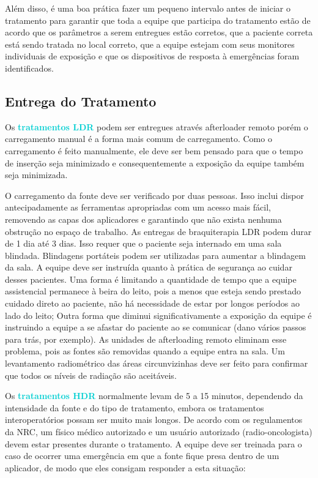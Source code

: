 \documentclass[11pt,a4paper]{article}
\newcounter{exemplo}
\begin{document}
	Além disso, é uma boa prática fazer um pequeno intervalo antes de iniciar o tratamento para garantir que toda a equipe que participa do tratamento estão de acordo que os parâmetros a serem entregues estão corretos, que a paciente correta está sendo tratada no local correto, que a equipe estejam com seus monitores individuais de exposição e que os dispositivos de resposta à emergências foram identificados.

\subsection*{Entrega do Tratamento}

	Os \textcolor{DarkTurquoise}{\textbf{tratamentos LDR}} podem ser entregues através afterloader remoto porém o carregamento manual é a forma mais comum de carregamento. Como o carregamento é feito manualmente, ele deve ser bem pensado para que o tempo de inserção seja minimizado e consequentemente a exposição da equipe também seja minimizada. 

	O carregamento da fonte deve ser verificado por duas pessoas. Isso inclui dispor antecipadamente as ferramentas apropriadas com um acesso mais fácil, removendo as capas dos aplicadores e garantindo que não exista nenhuma obstrução no espaço de trabalho. As entregas de braquiterapia LDR podem durar de 1 dia até 3 dias. Isso requer que o paciente seja internado em uma sala blindada. Blindagens portáteis podem ser utilizadas para aumentar a blindagem da sala. A equipe deve ser instruída quanto à prática de segurança ao cuidar desses pacientes. Uma forma é limitando a quantidade de tempo que a equipe assistencial permanece à beira do leito, pois a menos que esteja sendo prestado cuidado direto ao paciente, não há necessidade de estar por longos períodos ao lado do leito; Outra forma que diminui significativamente a exposição da equipe é instruindo a equipe a se afastar do paciente ao se comunicar (dano vários passos para trás, por exemplo). As unidades de afterloading remoto eliminam esse problema, pois as fontes são removidas quando a equipe entra na sala. Um levantamento radiométrico das áreas circunvizinhas deve ser feito para confirmar que todos os níveis de radiação são aceitáveis.

	Os \textcolor{DarkTurquoise}{\textbf{tratamentos HDR}} normalmente levam de 5 a 15 minutos, dependendo da intensidade da fonte e do tipo de tratamento, embora os tratamentos interoperatórios possam ser muito mais longos. De acordo com os regulamentos da NRC, um físico médico autorizado e um usuário autorizado (radio-oncologista) devem estar presentes durante o tratamento. A equipe deve ser treinada para o caso de ocorrer uma emergência em que a fonte fique presa dentro de um aplicador, de modo que eles consigam responder a esta situação:
\end{document}

